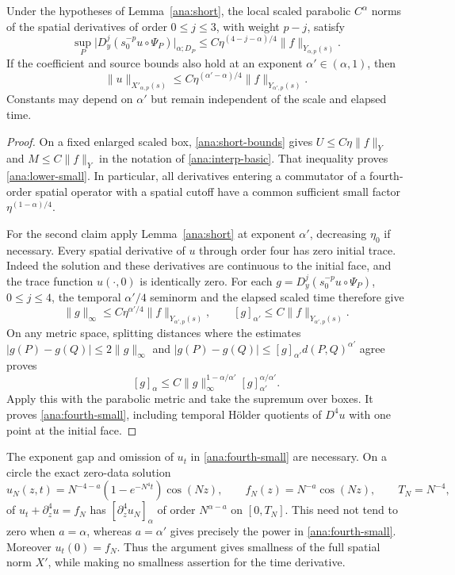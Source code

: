 \begin{lemma}
\label{ana:interpolation}
Under the hypotheses of Lemma~\ref{ana:short}, the local scaled
parabolic $C^\alpha$ norms of the spatial derivatives of order
$0\le j\le3$, with weight $p-j$, satisfy
\begin{equation}\label{ana:lower-small}
 \sup_P\bigl|D_y^j(s_0^{-p}u\circ\Psi_P)\bigr|_{\alpha;D_P}
 \le C\eta^{(4-j-\alpha)/4}\|f\|_{Y_{\alpha,p}(s)}.
\end{equation}
If the coefficient and source bounds also hold at an exponent
$\alpha'\in(\alpha,1)$, then
\begin{equation}\label{ana:fourth-small}
 \|u\|_{X'_{\alpha,p}(s)}
 \le C\eta^{(\alpha'-\alpha)/4}
                    \|f\|_{Y_{\alpha',p}(s)}.
\end{equation}
Constants may depend on $\alpha'$ but remain independent of the
scale and elapsed time.
\end{lemma}

\begin{proof}
On a fixed enlarged scaled box, \eqref{ana:short-bounds} gives
$U\le C\eta\|f\|_Y$ and $M\le C\|f\|_Y$ in the notation of
\eqref{ana:interp-basic}.  That inequality proves
\eqref{ana:lower-small}.  In particular, all derivatives entering
a commutator of a fourth-order spatial operator with a spatial
cutoff have a common sufficient small factor
$\eta^{(1-\alpha)/4}$.

For the second claim apply Lemma~\ref{ana:short} at exponent
$\alpha'$, decreasing $\eta_0$ if necessary.  Every spatial
derivative of $u$ through order four has zero initial trace.
Indeed the solution and these derivatives are continuous to the
initial face, and the trace function $u(\cdot,0)$ is identically
zero.  For each $g=D_y^j(s_0^{-p}u\circ\Psi_P)$, $0\le j\le4$,
the temporal $\alpha'/4$ seminorm and the elapsed scaled time
therefore give
\[
 \|g\|_\infty\le C\eta^{\alpha'/4}
                            \|f\|_{Y_{\alpha',p}(s)},\qquad
 [g]_{\alpha'}\le C\|f\|_{Y_{\alpha',p}(s)}.
\]
On any metric space, splitting distances where the estimates
$|g(P)-g(Q)|\le2\|g\|_\infty$ and
$|g(P)-g(Q)|\le[g]_{\alpha'}d(P,Q)^{\alpha'}$ agree proves
\[
 [g]_\alpha\le
 C\|g\|_\infty^{1-\alpha/\alpha'}
                   [g]_{\alpha'}^{\alpha/\alpha'}.
\]
Apply this with the parabolic metric and take the supremum over
boxes.  It proves \eqref{ana:fourth-small}, including temporal
H\"older quotients of $D^4u$ with one point at the initial face.
\end{proof}

\begin{remark}\label{ana:no-time-smallness}
The exponent gap and omission of $u_t$ in
\eqref{ana:fourth-small} are necessary.  On a circle the exact
zero-data solution
\[
 u_N(z,t)=N^{-4-a}(1-e^{-N^4t})\cos(Nz),\qquad
 f_N(z)=N^{-a}\cos(Nz),\qquad T_N=N^{-4},
\]
of $u_t+\partial_z^4u=f_N$ has
$[\partial_z^4u_N]_{\alpha}$ of order $N^{\alpha-a}$ on
$[0,T_N]$.  This need not tend to zero when $a=\alpha$, whereas
$a=\alpha'$ gives precisely the power in
\eqref{ana:fourth-small}.  Moreover $u_t(0)=f_N$.
Thus the argument gives smallness of the full spatial norm $X'$,
while making no smallness assertion for the time derivative.
\end{remark}
